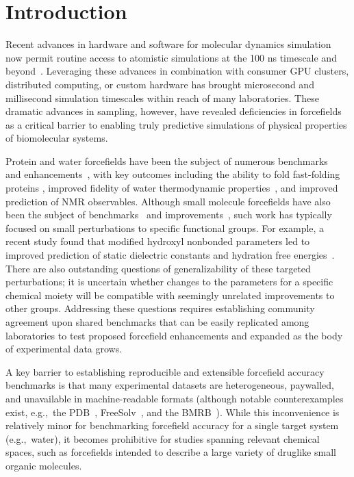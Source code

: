 \documentclass[journal=jacsat,manuscript=article]{achemso}
\begin{document}

\section{Introduction}

Recent advances in hardware and software for molecular dynamics simulation now permit routine access to atomistic simulations at the 100 ns timescale and beyond~\cite{salomon2013routine}.
Leveraging these advances in combination with consumer GPU clusters, distributed computing, or custom hardware has brought microsecond and millisecond simulation timescales within reach of many laboratories.  
These dramatic advances in sampling, however, have revealed deficiencies in forcefields as a critical barrier to enabling truly predictive simulations of physical properties of biomolecular systems.  

Protein and water forcefields have been the subject of numerous benchmarks~\cite{lindorff2012systematic, beauchamp2012protein, best2008} and enhancements~\cite{li2011iterative, best2012optimization, Lindorff-Larsen2010}, with key outcomes including the ability to fold fast-folding proteins \cite{shaw2011, ensign2007heterogeneity, Voelz2010}, improved fidelity of water thermodynamic properties~\cite{horn2004}, and improved prediction of NMR observables.  
Although small molecule forcefields have also been the subject of benchmarks~\cite{caleman2011force, fischer2015properties, zhang2015force} and improvements~\cite{fennell2014fixed}, such work has typically focused on small perturbations to specific functional groups.  
For example, a recent study found that modified hydroxyl nonbonded parameters led to improved prediction of static dielectric constants and hydration free energies~\cite{fennell2014fixed}.
There are also outstanding questions of generalizability of these targeted perturbations; it is uncertain whether changes to the parameters for a specific chemical moiety will be compatible with seemingly unrelated improvements to other groups.
Addressing these questions requires establishing community agreement upon shared benchmarks that can be easily replicated among laboratories to test proposed forcefield enhancements and expanded as the body of experimental data grows.

A key barrier to establishing reproducible and extensible forcefield accuracy benchmarks is that many experimental datasets are heterogeneous, paywalled, and unavailable in machine-readable formats (although notable counterexamples exist, e.g.,~the PDB~\cite{Berman2000}, FreeSolv~\cite{freesolv}, and the BMRB~\cite{Ulrich2008}).  
While this inconvenience is relatively minor for benchmarking forcefield accuracy for a single target system (e.g.,~water), it becomes prohibitive for studies spanning relevant chemical spaces, such as forcefields intended to describe a large variety of druglike small organic molecules.  
\end{document}

